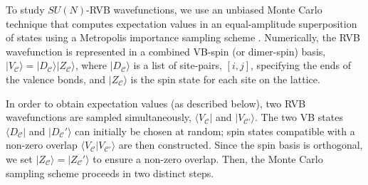 \documentclass[11pt]{iopart}
\begin{document}
To study $SU(N)$-RVB wavefunctions, we use an unbiased Monte Carlo technique that computes expectation values in an equal-amplitude superposition of states using a Metropolis importance sampling scheme \cite{RVB2}.  Numerically, the RVB wavefunction is represented in a combined VB-spin (or dimer-spin) basis, $|V_{\mathcal C} \rangle = |D_{\mathcal C} \rangle |Z_{\mathcal C} \rangle$, where $| D_{\mathcal C} \rangle$ is a list of site-pairs, $[i,j]$, specifying the ends of the valence bonds, and $|Z_{\mathcal C} \rangle$ is the spin state for each site on the lattice.

In order to obtain expectation values (as described below), two RVB wavefunctions are sampled simultaneously, $\langle V_{\mathcal C} |$ and $| V_{\mathcal C'} \rangle$.  The two VB states $\langle D_{\mathcal C} |$ and $| D_{\mathcal C}' \rangle$ can initially be chosen at random; spin states compatible with a non-zero overlap $\langle V_{\mathcal C} | V_{\mathcal C'} \rangle$ are then constructed.  Since the spin basis is orthogonal, we set $|Z_{\mathcal C} \rangle = | Z_{\mathcal C}' \rangle$ to ensure a non-zero overlap.  Then, the Monte Carlo sampling scheme proceeds in two distinct steps.   
\end{document}
